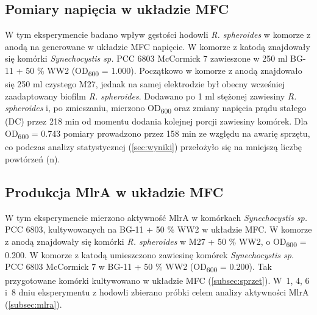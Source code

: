 \subsection{Pomiary napięcia w układzie MFC}\label{subsec:volt}
W tym eksperymencie badano wpływ gęstości hodowli
\textit{R. spheroides} w komorze z anodą na generowane
w układzie MFC napięcie.
W komorze z katodą znajdowały się komórki
\textit{Synechocystis sp.} PCC 6803 McCormick 7
zawieszone w 250 ml BG-11 + 50 \% WW2
(OD\textsubscript{600} = 1.000).
Początkowo w komorze z anodą znajdowało się 250 ml
czystego M27, jednak na samej elektrodzie był
obecny wcześniej zaadaptowany biofilm \textit{R. spheroides}.
Dodawano po 1 ml stężonej zawiesiny \textit{R. spheroides}
i, po zmieszaniu, mierzono OD\textsubscript{600} oraz
zmiany napięcia prądu stałego (DC) przez 218 min od
momentu dodania kolejnej porcji zawiesiny komórek.
Dla OD\textsubscript{600} = 0.743 pomiary prowadzono
przez 158 min ze względu na awarię sprzętu, co podczas
analizy statystycznej (\ref{sec:wyniki}) przełożyło się
na mniejszą liczbę powtórzeń (n).

\subsection{Produkcja MlrA w układzie MFC}\label{subsec:mfc}
W tym eksperymencie mierzono aktywność MlrA
w komórkach \textit{Synechocystis sp.} PCC 6803,
kultywowanych na BG-11 + 50 \% WW2 w układzie MFC\@.
W komorze z anodą znajdowały się komórki
\textit{R. spheroides} w M27 + 50 \% WW2,
o OD\textsubscript{600} = 0.200.
W komorze z katodą umieszczono zawiesinę komórek
\textit{Synechocystis sp.} PCC 6803 McCormick 7
w BG-11 + 50 \% WW2 (OD\textsubscript{600} = 0.200).
Tak przygotowane komórki kultywowano w układzie MFC (\ref{subsec:sprzet}).
W~1, 4, 6 i~8 dniu eksperymentu z hodowli zbierano próbki
celem analizy aktywności MlrA (\ref{subsec:mlra}).